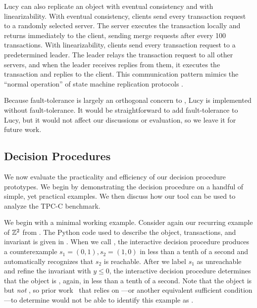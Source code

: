 Lucy can also replicate an object with eventual consistency and with
linearizability. With eventual consistency, clients send every transaction
request to a randomly selected server. The server executes the transaction
locally and returns immediately to the client, sending merge requests after
every 100 transactions. With linearizability, clients send every transaction
request to a predetermined leader. The leader relays the transaction request to
all other servers, and when the leader receives replies from them, it executes
the transaction and replies to the client. This communication pattern mimics
the ``normal operation'' of state machine replication protocols
\cite{lamport1998part, liskov2012viewstamped}.

Because fault-tolerance is largely an orthogonal concern to
\invariantconfluence{}, Lucy is implemented without fault-tolerance. It would
be straightforward to add fault-tolerance to Lucy, but it would not affect our
discussions or evaluation, so we leave it for future work.

\subsection{Decision Procedures}
We now evaluate the practicality and efficiency of our decision procedure
prototypes. We begin by demonstrating the decision procedure on a handful of
simple, yet practical examples. We then discuss how our tool can be used to
analyze the TPC-C benchmark.

\example[$\ints^2$]
We begin with a minimal working example. Consider again our recurring example
of $\ints^2$ from . The Python code used to describe the object,
transactions, and invariant is given in . When we call
, the interactive decision procedure produces a
counterexample $s_1 = (0, 1), s_2 = (1, 0)$ in less than a tenth of a second
and automatically recognizes that $s_2$ is reachable. After we label $s_1$ as
unreachable and refine the invariant with $y \leq 0$, the interactive decision
procedure determines that the object is \invariantconfluent{}, again, in less
than a tenth of a second. Note that the object is \invariantconfluent{} but
\emph{not} \invariantclosed{}, so prior work~\cite{li2012making,
li2014automating, balegas2015towards, gotsman2016cause} that relies on
\invariantclosure{}---or another equivalent sufficient condition---to determine
\invariantconfluence{} would not be able to identify this example as
\invariantconfluent{}.


